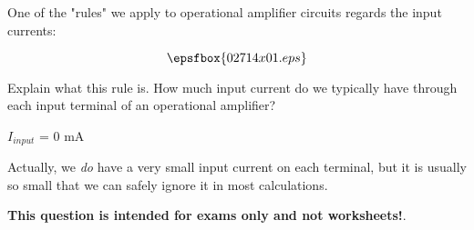 

One of the "rules" we apply to operational amplifier circuits regards the input currents:

$$\epsfbox{02714x01.eps}$$

Explain what this rule is.  How much input current do we typically have through each input terminal of an operational amplifier?







$I_{input}$ = 0 mA

\vskip 10pt

Actually, we {\it do} have a very small input current on each terminal, but it is usually so small that we can safely ignore it in most calculations.







{\bf This question is intended for exams only and not worksheets!}.




